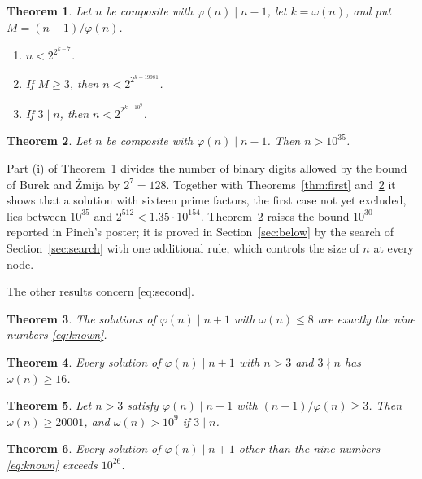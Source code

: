 \documentclass[11pt,reqno]{amsart}
\numberwithin{equation}{section}
\theoremstyle{plain}
\newtheorem{theorem}{Theorem}[section]
\theoremstyle{definition}
\theoremstyle{remark}
\begin{document}
\begin{theorem}\label{thm:size}
Let $n$ be composite with $\varphi(n)\mid n-1$, let $k=\omega(n)$, and
put $M=(n-1)/\varphi(n)$.
\begin{enumerate}[label=\textup{(\roman*)}]
\item $n<2^{2^{k-7}}$.
\item If $M\ge3$, then $n<2^{2^{k-19981}}$.
\item If $3\mid n$, then $n<2^{2^{k-10^9}}$.
\end{enumerate}
\end{theorem}

\begin{theorem}\label{thm:lower}
Let $n$ be composite with $\varphi(n)\mid n-1$. Then $n>10^{35}$.
\end{theorem}

Part (i) of Theorem~\ref{thm:size} divides the number of binary digits
allowed by the bound of Burek and \.Zmija by $2^7=128$. Together with
Theorems~\ref{thm:first} and~\ref{thm:lower} it shows that a solution
with sixteen prime factors, the first case not yet excluded, lies
between $10^{35}$ and $2^{512}<1.35\cdot10^{154}$.
Theorem~\ref{thm:lower} raises the bound $10^{30}$ reported in Pinch's
poster; it is proved in Section~\ref{sec:below} by the search of
Section~\ref{sec:search} with one additional rule, which controls the
size of $n$ at every node.

The other results concern \eqref{eq:second}.

\begin{theorem}\label{thm:eight}
The solutions of $\varphi(n)\mid n+1$ with $\omega(n)\le8$ are exactly
the nine numbers \eqref{eq:known}.
\end{theorem}

\begin{theorem}\label{thm:coprime}
Every solution of $\varphi(n)\mid n+1$ with $n>3$ and $3\nmid n$ has
$\omega(n)\ge16$.
\end{theorem}

\begin{theorem}\label{thm:quotient}
Let $n>3$ satisfy $\varphi(n)\mid n+1$ with $(n+1)/\varphi(n)\ge3$.
Then $\omega(n)\ge20001$, and $\omega(n)>10^9$ if $3\mid n$.
\end{theorem}

\begin{theorem}\label{thm:secondlower}
Every solution of $\varphi(n)\mid n+1$ other than the nine numbers
\eqref{eq:known} exceeds $10^{26}$.
\end{theorem}
\end{document}
